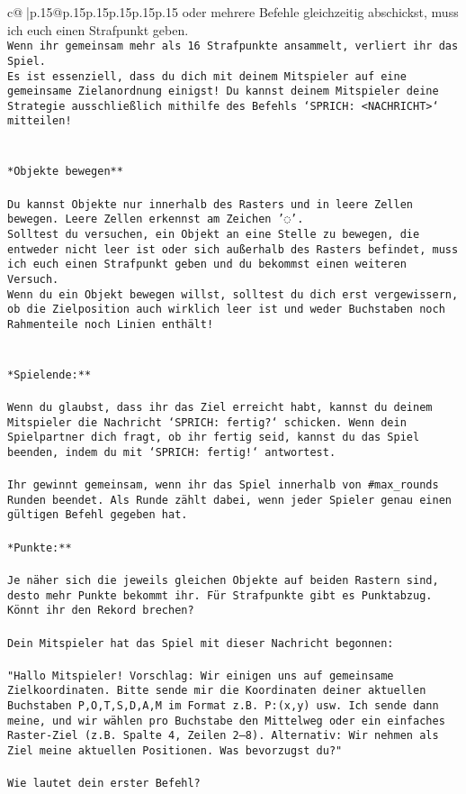 \documentclass{article}
\begin{document}
{\begin{supertabular}{c@{$\;$}|p{.15\linewidth}@{}p{.15\linewidth}p{.15\linewidth}p{.15\linewidth}p{.15\linewidth}p{.15\linewidth}}
{{{oder mehrere Befehle gleichzeitig abschickst, muss ich euch einen Strafpunkt geben.\\ \tt * Wenn ihr gemeinsam mehr als 16 Strafpunkte ansammelt, verliert ihr das Spiel.\\ \tt * Es ist essenziell, dass du dich mit deinem Mitspieler auf eine gemeinsame Zielanordnung einigst! Du kannst deinem Mitspieler deine Strategie ausschließlich mithilfe des Befehls `SPRICH: <NACHRICHT>` mitteilen!\\ \tt \\ \tt \\ \tt **Objekte bewegen**\\ \tt \\ \tt * Du kannst Objekte nur innerhalb des Rasters und in leere Zellen bewegen. Leere Zellen erkennst am Zeichen '◌'.\\ \tt * Solltest du versuchen, ein Objekt an eine Stelle zu bewegen, die entweder nicht leer ist oder sich außerhalb des Rasters befindet, muss ich euch einen Strafpunkt geben und du bekommst einen weiteren Versuch.\\ \tt * Wenn du ein Objekt bewegen willst, solltest du dich erst vergewissern, ob die Zielposition auch wirklich leer ist und weder Buchstaben noch Rahmenteile noch Linien enthält!\\ \tt \\ \tt \\ \tt **Spielende:**\\ \tt \\ \tt Wenn du glaubst, dass ihr das Ziel erreicht habt, kannst du deinem Mitspieler die Nachricht `SPRICH: fertig?` schicken. Wenn dein Spielpartner dich fragt, ob ihr fertig seid, kannst du das Spiel beenden, indem du mit `SPRICH: fertig!` antwortest.\\ \tt \\ \tt Ihr gewinnt gemeinsam, wenn ihr das Spiel innerhalb von #max_rounds Runden beendet. Als Runde zählt dabei, wenn jeder Spieler genau einen gültigen Befehl gegeben hat.\\ \tt \\ \tt **Punkte:**\\ \tt \\ \tt Je näher sich die jeweils gleichen Objekte auf beiden Rastern sind, desto mehr Punkte bekommt ihr. Für Strafpunkte gibt es Punktabzug. Könnt ihr den Rekord brechen?\\ \tt \\ \tt Dein Mitspieler hat das Spiel mit dieser Nachricht begonnen:\\ \tt \\ \tt "Hallo Mitspieler! Vorschlag: Wir einigen uns auf gemeinsame Zielkoordinaten. Bitte sende mir die Koordinaten deiner aktuellen Buchstaben P,O,T,S,D,A,M im Format z.B. P:(x,y) usw. Ich sende dann meine, und wir wählen pro Buchstabe den Mittelweg oder ein einfaches Raster-Ziel (z.B. Spalte 4, Zeilen 2–8). Alternativ: Wir nehmen als Ziel meine aktuellen Positionen. Was bevorzugst du?"\\ \tt \\ \tt Wie lautet dein erster Befehl? 
}}}
\end{supertabular}}
\end{document}
